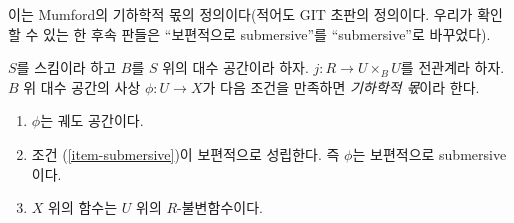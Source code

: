 \noindent
이는 Mumford의 기하학적 몫의 정의이다(적어도 GIT 초판의 정의이다.
우리가 확인할 수 있는 한 후속 판들은 “보편적으로 submersive”를
“submersive”로 바꾸었다).

\begin{definition}
\label{definition-geometric}
$S$를 스킴이라 하고 $B$를 $S$ 위의 대수 공간이라 하자.
$j : R \to U \times_B U$를 전관계라 하자.
$B$ 위 대수 공간의 사상 $\phi : U \to X$가 다음 조건을
만족하면 {\it 기하학적 몫}이라 한다.
\begin{enumerate}
\item $\phi$는 궤도 공간이다.
\item 조건 (\ref{item-submersive})이 보편적으로 성립한다.
즉 $\phi$는 보편적으로 submersive이다.
\item $X$ 위의 함수는 $U$ 위의 $R$-불변함수이다.
\end{enumerate}
\end{definition}






















